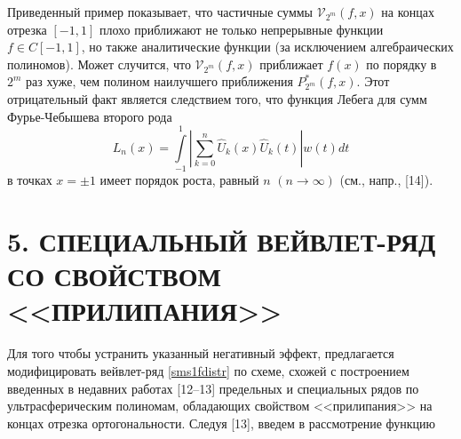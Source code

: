 \documentclass[12pt]{book}
\begin{document}
Приведенный пример показывает, что частичные суммы $\mathcal{V}_{2^m}(f, x)$ на концах отрезка $[-1,1]$ плохо приближают не только непрерывные функции $f \in C[-1,1]$, но также аналитические функции (за исключением алгебраических полиномов).
Может случится, что $\mathcal{V}_{2^m}(f, x)$ приближает $f(x)$ по порядку в $2^m$ раз хуже, чем полином наилучшего приближения $P^{*}_{2^m}(f,x)$.
Этот отрицательный факт является следствием того, что функция Лебега для сумм Фурье-Чебышева второго рода
\begin{equation*}
L_{n}(x) = \int\limits_{-1}^{1}  \left|\sum\limits_{k=0}^{n}\hat U_{k}(x)\hat U_{k}(t)\right| w(t)dt
\end{equation*}
в точках $x = \pm1$ имеет порядок роста, равный $n$ $(n\to\infty)$ (см., напр., [14]).





\section*{5. СПЕЦИАЛЬНЫЙ ВЕЙВЛЕТ-РЯД СО СВОЙСТВОМ <<ПРИЛИПАНИЯ>>}

Для того чтобы устранить указанный негативный эффект, предлагается модифицировать вейвлет-ряд \eqref{sms1fdistr} по схеме, схожей с построением введенных в недавних работах [12--13]
предельных и специальных рядов по ультрасферическим полиномам, обладающих свойством <<прилипания>> на концах отрезка ортогональности. Следуя [13],
введем в рассмотрение функцию
\end{document}
